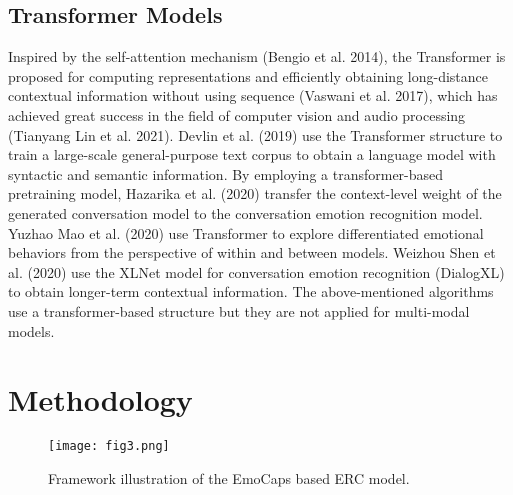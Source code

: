 \documentclass[11pt]{article}
\begin{document}
\subsection{Transformer Models}
Inspired by the self-attention mechanism (Bengio et al. 2014), the Transformer is proposed for computing representations and efficiently obtaining long-distance contextual information without using sequence (Vaswani et al. 2017), which has achieved great success in the field of computer vision and audio processing (Tianyang Lin et al. 2021). Devlin et al. (2019) use the Transformer structure to train a large-scale general-purpose text corpus to obtain a language model with syntactic and semantic information. By employing a transformer-based pretraining model, Hazarika et al. (2020) transfer the context-level weight of the generated conversation model to the conversation emotion recognition model. Yuzhao Mao et al. (2020) use Transformer to explore differentiated emotional behaviors from the perspective of within and between models. Weizhou Shen et al. (2020) use the XLNet model for conversation emotion recognition (DialogXL) to obtain longer-term contextual information. The above-mentioned algorithms use a transformer-based structure but they are not applied for multi-modal models.
\section{Methodology}
\begin{figure*}[t]
	\centering
	\texttt{[image: fig3.png]} \caption{Framework illustration of the EmoCaps based ERC model.}
	\label{fig3}
\end{figure*}
\end{document}
